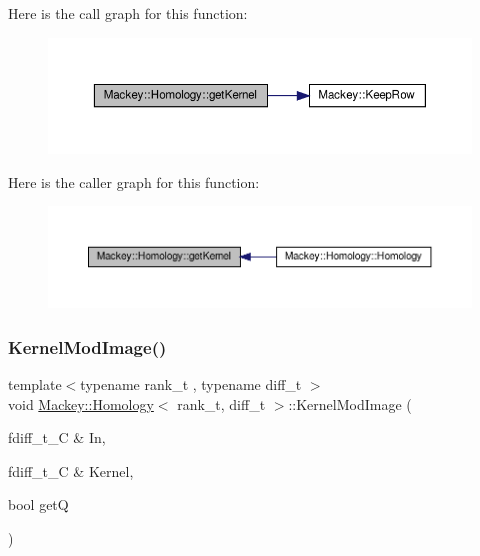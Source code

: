 Here is the call graph for this function\+:\nopagebreak
\begin{figure}[H]
\begin{center}
\leavevmode
\includegraphics[width=350pt]{classMackey_1_1Homology_a72296e393c6f22a526375b0169daab94_cgraph}
\end{center}
\end{figure}
Here is the caller graph for this function\+:\nopagebreak
\begin{figure}[H]
\begin{center}
\leavevmode
\includegraphics[width=350pt]{classMackey_1_1Homology_a72296e393c6f22a526375b0169daab94_icgraph}
\end{center}
\end{figure}
\mbox{\label{classMackey_1_1Homology_a902c8dfef7da8ad9f5e03d16eb60a423}} 
\subsubsection{\texorpdfstring{Kernel\+Mod\+Image()}{KernelModImage()}}
{\footnotesize\ttfamily template$<$typename rank\+\_\+t , typename diff\+\_\+t $>$ \\
void \hyperlink{classMackey_1_1Homology}{Mackey\+::\+Homology}$<$ rank\+\_\+t, diff\+\_\+t $>$\+::Kernel\+Mod\+Image (\begin{DoxyParamCaption}\item[{fdiff\+\_\+t\+\_\+C \&}]{In,  }\item[{fdiff\+\_\+t\+\_\+C \&}]{Kernel,  }\item[{bool}]{getQ }\end{DoxyParamCaption})}

